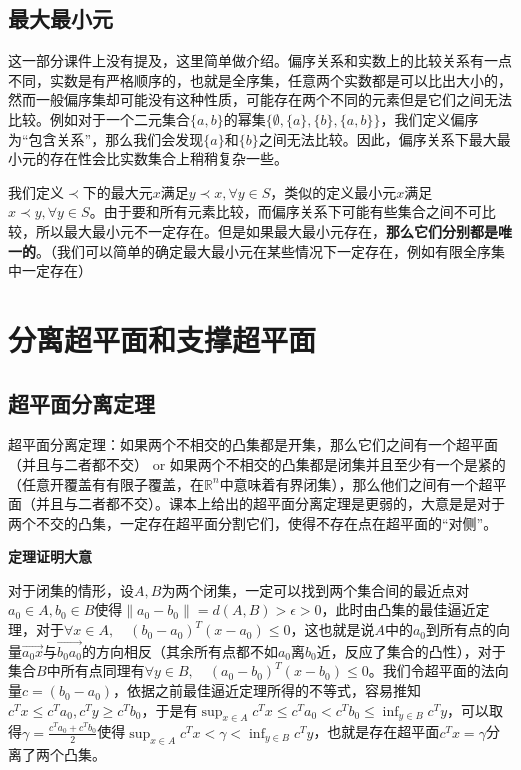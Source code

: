\documentclass[12pt,a4paper]{book}
\begin{document}
\subsection{最大最小元}

这一部分课件上没有提及，这里简单做介绍。偏序关系和实数上的比较关系有一点不同，实数是有严格顺序的，也就是全序集，任意两个实数都是可以比出大小的，然而一般偏序集却可能没有这种性质，可能存在两个不同的元素但是它们之间无法比较。例如对于一个二元集合$\{a,b\}$的幂集$\{\emptyset,\{a\},\{b\},\{a,b\}\}$，我们定义偏序为“包含关系”，那么我们会发现$\{a\}$和$\{b\}$之间无法比较。因此，偏序关系下最大最小元的存在性会比实数集合上稍稍复杂一些。

我们定义$\prec$下的最大元$x$满足$y\prec x ,\forall y\in S$，类似的定义最小元$x$满足$x\prec y,\forall y\in S$。由于要和所有元素比较，而偏序关系下可能有些集合之间不可比较，所以最大最小元不一定存在。但是如果最大最小元存在，\textbf{那么它们分别都是唯一的}。（我们可以简单的确定最大最小元在某些情况下一定存在，例如有限全序集中一定存在）

\section{分离超平面和支撑超平面}

\subsection{超平面分离定理}
超平面分离定理：如果两个不相交的凸集都是开集，那么它们之间有一个超平面（并且与二者都不交） or 如果两个不相交的凸集都是闭集并且至少有一个是紧的（任意开覆盖有有限子覆盖，在$\mathbb{R}^n$中意味着有界闭集），那么他们之间有一个超平面（并且与二者都不交）。课本上给出的超平面分离定理是更弱的，大意是是对于两个不交的凸集，一定存在超平面分割它们，使得不存在点在超平面的“对侧”。

\textbf{定理证明大意}

对于闭集的情形，设$A,B$为两个闭集，一定可以找到两个集合间的最近点对$a_0\in A,b_0\in B$使得$\|a_0-b_0\|=d(A,B)> \epsilon > 0$，此时由凸集的最佳逼近定理，对于$\forall x\in A, \quad (b_0-a_0)^T(x-a_0)\leq 0$，这也就是说$A$中的$a_0$到所有点的向量$\overrightarrow{a_0x}$与$\overrightarrow{b_0a_0}$的方向相反（其余所有点都不如$a_0$离$b_0$近，反应了集合的凸性），对于集合$B$中所有点同理有$\forall y\in B, \quad (a_0-b_0)^T(x-b_0)\leq 0$。我们令超平面的法向量$c=(b_0-a_0)$，依据之前最佳逼近定理所得的不等式，容易推知$c^Tx\leq c^T a_0,c^Ty\geq c^T b_0$，于是有$\sup_{x\in A} c^Tx \leq c^Ta_0<c^Tb_0\leq \inf_{y\in B}c^Ty$，可以取得$\gamma = \frac{c^Ta_0+c^Tb_0}{2}$使得$\sup_{x\in A} c^Tx <\gamma< \inf_{y\in B}c^Ty$，也就是存在超平面$c^Tx=\gamma$分离了两个凸集。
\end{document}
